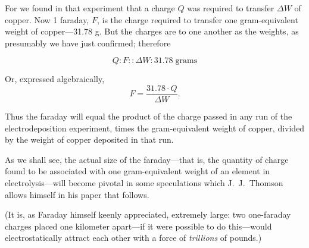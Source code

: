 For we found in that experiment that a charge $Q$ was required to
transfer $\Delta W$ of copper. Now 1 faraday, $F$, is the charge
required to transfer one gram-equivalent weight of copper---31.78 g.
But the charges are to one another as the weights, as presumably we have
just confirmed; therefore

\begin{equation*}
Q : F :: \Delta W : 31.78\; \text{grams}
\end{equation*}

Or, expressed algebraically,
\begin{equation*}
F = \frac{31.78\cdot Q}{\Delta W}.
\end{equation*}

Thus the faraday will equal the product of the charge passed in any run
of the electrodeposition experiment, times the gram-equivalent weight of
copper, divided by the weight of copper deposited in that run.

As we shall see, the actual size of the faraday---that is, the quantity
of charge found to be associated with one gram-equivalent weight of an
element in electrolysis---will become pivotal in some speculations which
J.\ J.\ Thomson allows himself in his paper that follows.

(It is, as Faraday himself keenly appreciated, extremely large: two
one-faraday charges placed one kilometer apart---if it were possible to do
this---would e\-lec\-tro\-stat\-ic\-al\-ly attract each other with a force of
\emph{trillions} of pounds.)
